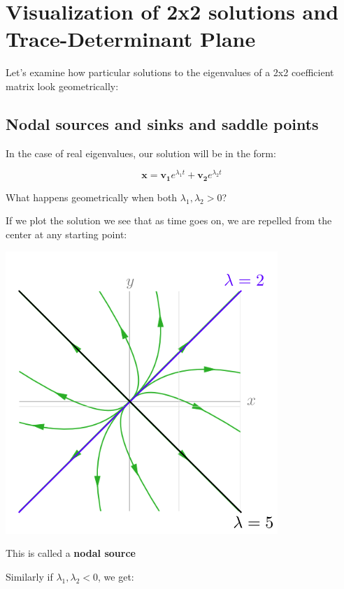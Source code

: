 \documentclass{report}
\begin{document}
\section{Visualization of 2x2 solutions and Trace-Determinant Plane}

Let's examine how particular solutions to the eigenvalues of a 2x2 coefficient matrix look geometrically:


\subsection{Nodal sources and sinks and saddle points}

In the case of real eigenvalues, our solution will be in the form:

$$\mathbf{x} = \mathbf{v_1}e^{\lambda_1 t} + \mathbf{v_2}e^{\lambda_2 t}$$

What happens geometrically when both $\lambda_1, \lambda_2 > 0$?

If we plot the solution we see that as time goes on, we are repelled from the center at any starting point:

\includegraphics[scale=0.5]{nodal_source.png}

This is called a \textbf{nodal source}

Similarly if $\lambda_1,\lambda_2 < 0$, we get:
\end{document}
